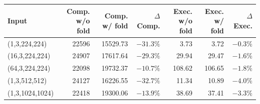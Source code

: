 \begin{tabular}{lrrrrrr}
\toprule
\textbf{Input} & \textbf{Comp. w/o fold} & \textbf{Comp. w/ fold} & \(\Delta\)\textbf{ Comp.} & \textbf{Exec. w/o fold} & \textbf{Exec. w/ fold} & \(\Delta\)\textbf{ Exec.} \\
\midrule
(1,3,224,224) & 22596 & 15529.73 & \(-31.3\%\) & 3.73 & 3.72 & \(-0.3\%\) \\
(16,3,224,224) & 24907 & 17617.64 & \(-29.3\%\) & 29.94 & 29.47 & \(-1.6\%\) \\
(64,3,224,224) & 22098 & 19732.37 & \(-10.7\%\) & 108.62 & 106.65 & \(-1.8\%\) \\
(1,3,512,512) & 24127 & 16226.55 & \(-32.7\%\) & 11.34 & 10.89 & \(-4.0\%\) \\
(1,3,1024,1024) & 22418 & 19300.06 & \(-13.9\%\) & 38.69 & 37.41 & \(-3.3\%\) \\
\bottomrule
\end{tabular}
